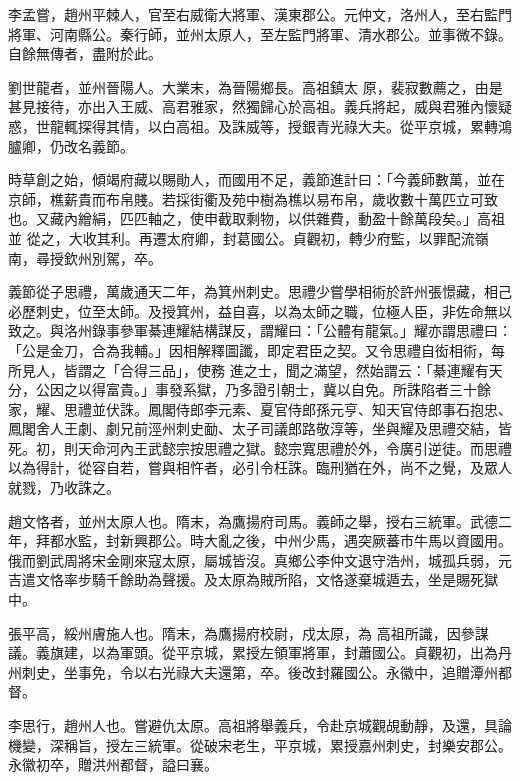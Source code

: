 \begin{pinyinscope}
 李孟嘗，趙州平棘人，官至右威衛大將軍、漢東郡公。元仲文，洛州人，至右監門將軍、河南縣公。秦行師，並州太原人，至左監門將軍、清水郡公。並事微不錄。自餘無傳者，盡附於此。



 劉世龍者，並州晉陽人。大業末，為晉陽鄉長。高祖鎮太
 原，裴寂數薦之，由是甚見接待，亦出入王威、高君雅家，然獨歸心於高祖。義兵將起，威與君雅內懷疑惑，世龍輒探得其情，以白高祖。及誅威等，授銀青光祿大夫。從平京城，累轉鴻臚卿，仍改名義節。



 時草創之始，傾竭府藏以賜勛人，而國用不足，義節進計曰：「今義師數萬，並在京師，樵薪貴而布帛賤。若採街衢及苑中樹為樵以易布帛，歲收數十萬匹立可致也。又藏內繒絹，匹匹軸之，使申截取剩物，以供雜費，動盈十餘萬段矣。」高祖並
 從之，大收其利。再遷太府卿，封葛國公。貞觀初，轉少府監，以罪配流嶺南，尋授欽州別駕，卒。



 義節從子思禮，萬歲通天二年，為箕州刺史。思禮少嘗學相術於許州張憬藏，相己必歷刺史，位至太師。及授箕州，益自喜，以為太師之職，位極人臣，非佐命無以致之。與洛州錄事參軍綦連耀結構謀反，謂耀曰：「公體有龍氣。」耀亦謂思禮曰：「公是金刀，合為我輔。」因相解釋圖讖，即定君臣之契。又令思禮自衒相術，每所見人，皆謂之「合得三品」，使務
 進之士，聞之滿望，然始謂云：「綦連耀有天分，公因之以得富貴。」事發系獄，乃多證引朝士，冀以自免。所誅陷者三十餘家，耀、思禮並伏誅。鳳閣侍郎李元素、夏官侍郎孫元亨、知天官侍郎事石抱忠、鳳閣舍人王劇、劇兄前涇州刺史勔、太子司議郎路敬淳等，坐與耀及思禮交結，皆死。初，則天命河內王武懿宗按思禮之獄。懿宗寬思禮於外，令廣引逆徒。而思禮以為得計，從容自若，嘗與相忤者，必引令枉誅。臨刑猶在外，尚不之覺，及眾人
 就戮，乃收誅之。



 趙文恪者，並州太原人也。隋末，為鷹揚府司馬。義師之舉，授右三統軍。武德二年，拜都水監，封新興郡公。時大亂之後，中州少馬，遇突厥蕃市牛馬以資國用。俄而劉武周將宋金剛來寇太原，屬城皆沒。真鄉公李仲文退守浩州，城孤兵弱，元吉遣文恪率步騎千餘助為聲援。及太原為賊所陷，文恪遂棄城遁去，坐是賜死獄中。



 張平高，綏州膚施人也。隋末，為鷹揚府校尉，戍太原，為
 高祖所識，因參謀議。義旗建，以為軍頭。從平京城，累授左領軍將軍，封蕭國公。貞觀初，出為丹州刺史，坐事免，令以右光祿大夫還第，卒。後改封羅國公。永徽中，追贈潭州都督。



 李思行，趙州人也。嘗避仇太原。高祖將舉義兵，令赴京城觀覘動靜，及還，具論機變，深稱旨，授左三統軍。從破宋老生，平京城，累授嘉州刺史，封樂安郡公。永徽初卒，贈洪州都督，謚曰襄。




\end{pinyinscope}

